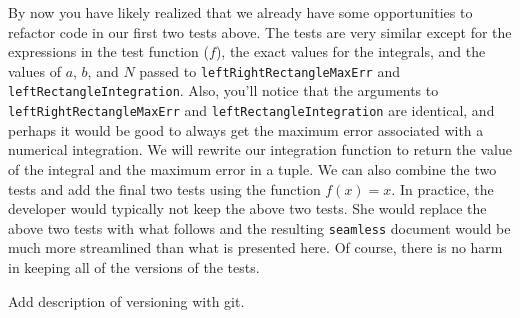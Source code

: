 \begin{seamlessnote}
  By now you have likely realized that we already have some opportunities to refactor code in
  our first two tests above. The tests are very similar except for the expressions in the 
  test function ($f$), the exact values for the integrals, and the values of $a$, $b$, and $N$
  passed to \lstinline{leftRightRectangleMaxErr} and \lstinline{leftRectangleIntegration}.
  Also, you'll notice that the arguments to 
  \lstinline{leftRightRectangleMaxErr} and \lstinline{leftRectangleIntegration}
  are identical, and perhaps it would be good to always get the maximum error associated with a
  numerical integration.
  We will rewrite our integration function to return the value of the integral and
  the maximum error in a tuple. 
  We can also combine the two tests and add the final two tests using the function $f(x) = x$.
  In practice, the developer would typically not keep the above two tests. She would 
  replace the above two tests with what follows and the resulting \lstinline{seamless} 
  document would be much more streamlined than what is presented here. Of course, there is no 
  harm in keeping all of the versions of the tests.
\end{seamlessnote}

\begin{TODO}
  Add description of versioning with git.
\end{TODO}

